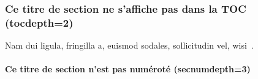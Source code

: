 \subsubsection{Ce titre de section ne s'affiche pas dans la TOC (tocdepth=2)}
Nam dui ligula, fringilla a, euismod sodales, sollicitudin vel, wisi~\parencite{zohdy_mapping_2012}. %
\paragraph{Ce titre de section n'est pas numéroté (secnumdepth=3)}~~\\ %

\lipsum[66]

